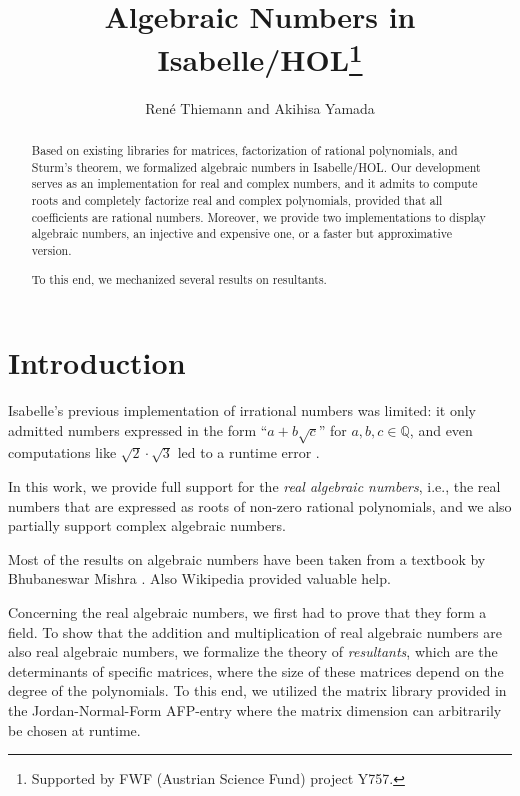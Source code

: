\documentclass[11pt,a4paper]{article}
\newcommand\rats{\mathbb{Q}}
\newcommand\rais{real algebraic numbers\xspace}
\begin{document}
\title{Algebraic Numbers in Isabelle/HOL\footnote{Supported by FWF (Austrian Science Fund) project Y757.}}
\author{Ren\'e Thiemann and Akihisa Yamada}
\maketitle

\begin{abstract}
Based on existing libraries for matrices, factorization of rational polynomials, 
and Sturm's theorem,
we formalized algebraic numbers in Isabelle/HOL. Our development serves
as an implementation for real and complex numbers, and it admits to compute roots
and completely factorize real and complex polynomials, provided that all
coefficients are rational numbers. Moreover, we provide two implementations to display
algebraic numbers, an injective and expensive one, or a faster but approximative version.

To this end, we mechanized several results on resultants.
\end{abstract}

\tableofcontents

\section{Introduction}

Isabelle's previous implementation of irrational numbers was limited:
it only admitted numbers expressed in the form ``$a+b\sqrt{c}$'' for $a,b,c \in \rats$,
and even computations like $\sqrt2 \cdot \sqrt3$ led to a runtime error \cite{Real-AFP}.

In this work, we provide full support for the \emph{real algebraic numbers},
i.e., the real numbers that are expressed as roots of non-zero rational polynomials,
and we also partially support complex algebraic numbers.

Most of the results on algebraic numbers have been taken from a textbook 
by Bhubaneswar Mishra \cite{AlgNumbers}.
Also Wikipedia provided valuable help.

\medskip
Concerning the real algebraic numbers, we first had to prove that they form a field.
To show that the addition and multiplication of \rais are also \rais,
we formalize the theory of \emph{resultants}, which are the determinants of 
specific matrices, where the size of these matrices depend on the degree of the 
polynomials. To this end, we utilized the matrix library provided in the Jordan-Normal-Form
AFP-entry \cite{JNF-AFP} where the matrix dimension can arbitrarily be chosen at runtime.
\end{document}

